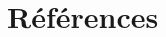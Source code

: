 \documentclass[11pt, french]{article}
\begin{document}
\renewcommand{\tablename}{Tableau}
\renewcommand{\listfigurename}{Liste des figures}

\begin{spacing}{1}
    \listoftodos
\end{spacing}




\begin{spacing}{1}
    \tableofcontents
\end{spacing}

\newpage

\begin{spacing}{1}
    \listoffigures
\end{spacing}

\newpage

\begin{spacing}{1}
    \listoftables
\end{spacing}

\newpage







\newpage

\section{Références}
\printbibliography[heading=none]

\newpage

\begin{appendices}
    
\end{appendices}
\end{document}
